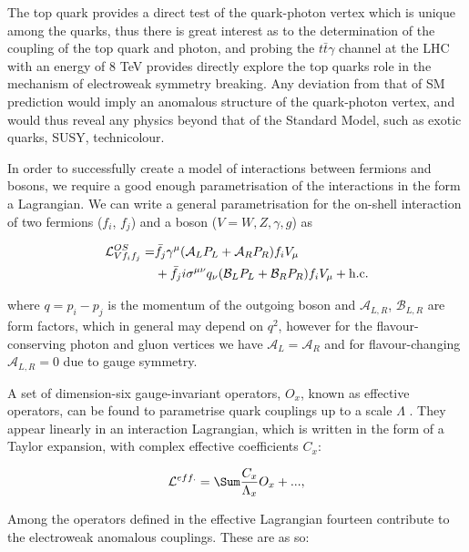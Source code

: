 The top quark provides a direct test of the quark-photon vertex which is unique among the quarks, thus there is great interest as to the determination of the coupling of the top quark and photon, and probing the $t\bar{t}\gamma$ channel at the LHC with an energy of 8 TeV provides directly explore the top quarks role in the mechanism of electroweak symmetry breaking. Any deviation from that of SM prediction would imply an anomalous structure of the quark-photon vertex, and would thus reveal any physics beyond that of the Standard Model, such as exotic quarks, SUSY, technicolour. 

In order to successfully create a model of interactions between fermions and bosons, we require a good enough parametrisation of the interactions in the form a Lagrangian. We can write a general parametrisation for the on-shell interaction of two fermions ($f_i$, $f_j$) and a boson ($V = W,Z,\gamma,g$) as

\begin{equation}
\begin{split}
\mathcal{L}^{OS}_{Vf_if_j} = & \bar{f}_j\gamma^{\mu} (\mathcal{A}_L P_L + \mathcal{A}_R P_R)f_i V_{\mu} \\
& + \bar{f}_j i \sigma^{\mu \nu} q_{\nu}(\mathcal{B}_L P_L + \mathcal{B}_R P_R) f_i V_{\mu} + \text{h.c.}
\end{split}
\end{equation}

where $q = p_i - p_j$ is the momentum of the outgoing boson and $\mathcal{A}_{L,R}$, $\mathcal{B}_{L,R}$ are form factors, which in general may depend on $q^2$, however for the flavour-conserving photon and gluon vertices we have $\mathcal{A}_L = \mathcal{A}_R$ and for flavour-changing $\mathcal{A}_{L,R} = 0$ due to gauge symmetry. 

A set of dimension-six gauge-invariant operators, $O_x$, known as effective operators, can be found to parametrise quark couplings up to a scale $\Lambda$ \cite{anom-coups}. They appear linearly in an interaction Lagrangian, which is written in the form of a Taylor expansion, with complex effective coefficients $C_x$:

\begin{equation} \label{eqn-EffectiveOperators}
\lumi^{eff.} = \Sum \frac{C_x}{\Lambda_x}O_x + ... ,
\end{equation}

Among the operators defined in the effective Lagrangian \cite{Buchmuller:1985jz} fourteen contribute to the electroweak anomalous couplings. These are as so:

